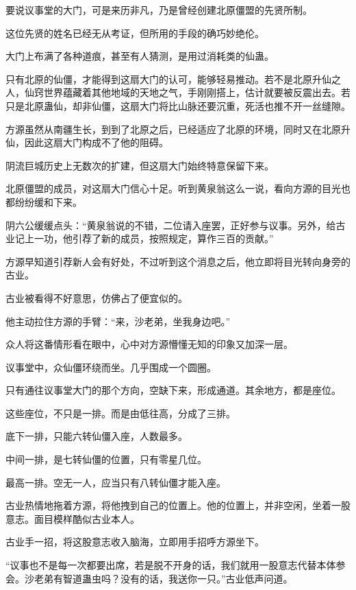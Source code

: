 
\begin{this_body}

要说议事堂的大门，可是来历非凡，乃是曾经创建北原僵盟的先贤所制。

这位先贤的姓名已经无从考证，但所用的手段的确巧妙绝伦。

大门上布满了各种道痕，甚至有人猜测，是用过消耗类的仙蛊。

只有北原的仙僵，才能得到这扇大门的认可，能够轻易推动。若不是北原升仙之人，仙窍世界蕴藏着其他地域的天地之气，手刚刚搭上，估计就要被反震出去。若只是北原蛊仙，却非仙僵，这扇大门将比山脉还要沉重，死活也推不开一丝缝隙。

方源虽然从南疆生长，到到了北原之后，已经适应了北原的环境，同时又在北原升仙，因此这扇大门构成不了他的阻碍。

阴流巨城历史上无数次的扩建，但这扇大门始终特意保留下来。

北原僵盟的成员，对这扇大门信心十足。听到黄泉翁这么一说，看向方源的目光也都纷纷缓和下来。

阴六公缓缓点头：“黄泉翁说的不错，二位请入座罢，正好参与议事。另外，给古业记上一功，他引荐了新的成员，按照规定，算作三百的贡献。”

方源早知道引荐新人会有好处，不过听到这个消息之后，他立即将目光转向身旁的古业。

古业被看得不好意思，仿佛占了便宜似的。

他主动拉住方源的手臂：“来，沙老弟，坐我身边吧。”

众人将这番情形看在眼中，心中对方源懵懂无知的印象又加深一层。

议事堂中，众仙僵环绕而坐。几乎围成一个圆圈。

只有通往议事堂大门的那个方向，空缺下来，形成通道。其余地方，都是座位。

这些座位，不只是一排。而是由低往高，分成了三排。

底下一排，只能六转仙僵入座，人数最多。

中间一排，是七转仙僵的位置，只有零星几位。

最高一排。空无一人，应当只有八转仙僵才能入座。

古业热情地拖着方源，将他拽到自己的位置上。他的位置上，并非空闲，坐着一股意志。面目模样酷似古业本人。

古业手一招，将这股意志收入脑海，立即用手招呼方源坐下。

“议事也不是每一次都要出席，若是脱不开身的话，我们就用一股意志代替本体参会。沙老弟有智道蛊虫吗？没有的话，我送你一只。”古业低声问道。


\end{this_body}
